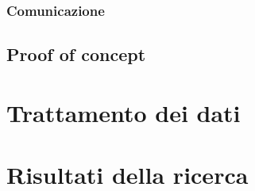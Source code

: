 		\subsubsection{Comunicazione}
	\subsection{Proof of concept}

\section{Trattamento dei dati}

\section{Risultati della ricerca}